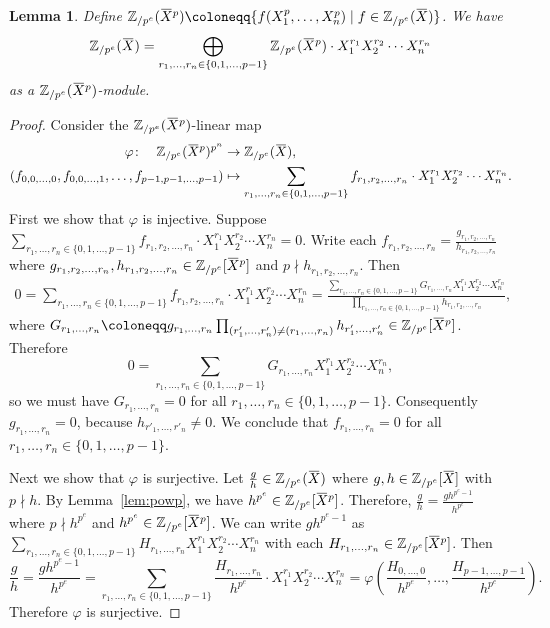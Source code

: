 \documentclass[letterpaper, 11pt, thm-restate]{article}
\numberwithin{equation}{section}
\newcommand{\Zpe}{\mathbb{Z}_{/p^e}}
\newcommand{\oX}{\mkern 1.5mu\overline{\mkern-1.5mu X \mkern-1.5mu}\mkern 1.5mu}
\newtheorem{lem}[thrm]{Lemma}
\theoremstyle{definition}
\theoremstyle{definition}
\theoremstyle{definition}
\begin{document}
\begin{lem}\label{lem:splitfree}
Define $\Zpe(\oX^p) \coloneqq \{f(X_1^p, \ldots, X_n^p) \mid f \in \Zpe(\oX)\}$.
We have
\[
\Zpe(\oX) = \bigoplus_{r_1, \ldots, r_n \in \{0, 1, \ldots, p-1\}} \Zpe(\oX^p) \cdot X_1^{r_1} X_2^{r_2} \cdots X_n^{r_n}
\]
as a $\Zpe(\oX^p)$-module.
\end{lem}
\begin{proof}
    Consider the $\Zpe(\oX^p)$-linear map
    \begin{align*}
        \varphi \colon \quad \Zpe(\oX^p)^{p^n} & \rightarrow \Zpe(\oX), \\
        (f_{0,0,\ldots,0}, f_{0,0,\ldots,1}, \ldots, f_{p-1, p-1, \ldots, p-1}) & \mapsto \sum_{r_1, \ldots, r_n \in \{0, 1, \ldots, p-1\}} f_{r_1,r_2,\ldots,r_n} \cdot X_1^{r_1} X_2^{r_2} \cdots X_n^{r_n}.
    \end{align*}
    First we show that $\varphi$ is injective.
    Suppose $\sum_{r_1, \ldots, r_n \in \{0, 1, \ldots, p-1\}} f_{r_1,r_2,\ldots,r_n} \cdot X_1^{r_1} X_2^{r_2} \cdots X_n^{r_n} = 0$.
    Write each $f_{r_1,r_2,\ldots,r_n} = \frac{g_{r_1,r_2,\ldots,r_n}}{h_{r_1,r_2,\ldots,r_n}}$ where $g_{r_1,r_2,\ldots,r_n}, h_{r_1,r_2,\ldots,r_n} \in \Zpe[\oX^p]$ and $p \nmid h_{r_1,r_2,\ldots,r_n}$.
    Then
    \begin{multline*}
    0 = \sum_{r_1, \ldots, r_n \in \{0, 1, \ldots, p-1\}} f_{r_1,r_2,\ldots,r_n} \cdot X_1^{r_1} X_2^{r_2} \cdots X_n^{r_n} = 
    \frac{\sum_{r_1, \ldots, r_n \in \{0, 1, \ldots, p-1\}} G_{r_1, \ldots, r_n} X_1^{r_1} X_2^{r_2} \cdots X_n^{r_n}}{\prod_{r_1, \ldots, r_n \in \{0, 1, \ldots, p-1\}} h_{r_1,r_2,\ldots,r_n}},
    \end{multline*}
    where $G_{r_1, \ldots, r_n} \coloneqq g_{r_1, \ldots, r_n} \prod_{(r'_1, \ldots, r'_n) \neq (r_1, \ldots, r_n)} h_{r'_1, \ldots, r'_n} \in \Zpe[\oX^p]$.
    Therefore
    \[
    0 = \sum_{r_1, \ldots, r_n \in \{0, 1, \ldots, p-1\}} G_{r_1, \ldots, r_n} X_1^{r_1} X_2^{r_2} \cdots X_n^{r_n},
    \]
    so we must have $G_{r_1, \ldots, r_n} = 0$ for all $r_1, \ldots, r_n \in \{0, 1, \ldots, p-1\}$.
    Consequently $g_{r_1, \ldots, r_n} = 0$, because $h_{r'_1, \ldots, r'_n} \neq 0$. We conclude that $f_{r_1, \ldots, r_n} = 0$ for all $r_1, \ldots, r_n \in \{0, 1, \ldots, p-1\}$.

    Next we show that $\varphi$ is surjective.
    Let $\frac{g}{h} \in \Zpe(\oX)$ where $g, h \in \Zpe[\oX]$ with $p \nmid h$.
    By Lemma~\ref{lem:powp}, we have $h^{p^{e}} \in \Zpe[\oX^p]$.
    Therefore, $\frac{g}{h} = \frac{g h^{p^{e} - 1}}{h^{p^{e}}}$ where $p \nmid h^{p^{e}}$ and $h^{p^{e}} \in \Zpe[\oX^p]$.
    We can write $g h^{p^{e} - 1}$ as $\sum_{r_1, \ldots, r_n \in \{0, 1, \ldots, p-1\}} H_{r_1, \ldots, r_n} X_1^{r_1} X_2^{r_2} \cdots X_n^{r_n}$ with each $H_{r_1, \ldots, r_n} \in \Zpe[\oX^p]$.
    Then
    \[
    \frac{g}{h} = \frac{g h^{p^{e} - 1}}{h^{p^{e}}} = \sum_{r_1, \ldots, r_n \in \{0, 1, \ldots, p-1\}} \frac{H_{r_1, \ldots, r_n}}{h^{p^{e}}} \cdot X_1^{r_1} X_2^{r_2} \cdots X_n^{r_n} = \varphi\left(\frac{H_{0, \ldots, 0}}{h^{p^{e}}}, \ldots, \frac{H_{p-1, \ldots, p-1}}{h^{p^{e}}}\right).
    \]
    Therefore $\varphi$ is surjective.


\end{proof}
\end{document}
